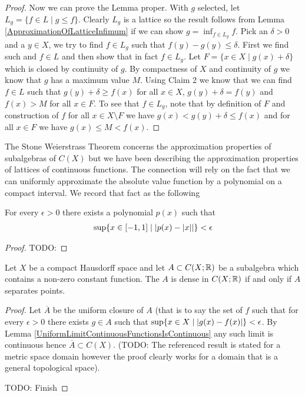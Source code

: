 \begin{proof}
Now we can prove the Lemma proper.  With $g$ selected, let $L_g =
\lbrace f \in L \mid g \leq f \rbrace$.  Clearly $L_g$ is a lattice so
the result follows from Lemma \ref{ApproximationOfLatticeInfimum} if
we can show $g = \inf_{f \in L_g} f$.  Pick an $\delta > 0$ and a $y
\in X$, we try
to find $f \in L_g$ such that $f(y) - g(y) 
\leq \delta$.  First we find
such and $f \in L$ and then show that in fact $f \in L_g$.  Let $F =
\lbrace x\in X \mid g(x) + \delta \rbrace$ which is closed by
continuity of $g$.  By compactness of $X$ and continuity of $g$ we
know that $g$ has a maximum value $M$.  Using Claim 2 we know that we
can find $f \in L$ such that $g(y) +\delta \geq f(x)$ for all $x \in
X$, $g(y) + \delta = f(y)$ and $f(x) > M$ for all $x \in F$.  To see
that $f \in L_g$, note that by definition of $F$ and construction of $f$  for all $x \in X
\setminus F$ we have 
$g(x) < g(y) + \delta \leq f(x)$ and for all $x \in F$ we have $g(x)
\leq M < f(x)$.
\end{proof}

The Stone Weierstrass Theorem concerns the approximation properties of
subalgebras of $C(X)$ but we have been describing the approximation
properties of lattices of continuous functions.  The connection will
rely on the fact that we can uniformly approximate the absolute value
function by a polynomial on a compact interval.  We record that fact
as the following 
\begin{lem}For every $\epsilon > 0$ there exists a polynomial $p(x)$
  such that 
\begin{align*}
\sup \lbrace x \in [-1,1] \mid \left \vert p(x) - \left \vert x \right \vert \right \vert
  \rbrace < \epsilon
\end{align*}
\end{lem}
\begin{proof}
TODO:
\end{proof}

\begin{thm}\label{StoneWeierstrassApproximation}Let $X$ be a compact Hausdorff space and let $A \subset
  C(X;\mathbb{R})$ be a subalgebra which contains a non-zero constant
  function.  The $A$ is dense in $C(X;\mathbb{R})$ if and only if $A$
  separates points.
\end{thm}
\begin{proof}
Let $\overline{A}$ be the uniform closure of $A$ (that is to say the
set of $f$ such that for every $\epsilon > 0$ there exists $g \in A$
such that $\sup \lbrace x \in X \mid \left \vert g(x) - f(x) \right \vert \rbrace <
\epsilon$.  By Lemma \ref{UniformLimitContinuousFunctionsIsContinuous}
any such limit is continuous hence $\overline{A} \subset C(X)$. (TODO: The referenced result is stated
for a metric space domain however the proof clearly works for a domain
that is a general topological space).

TODO: Finish
\end{proof}

